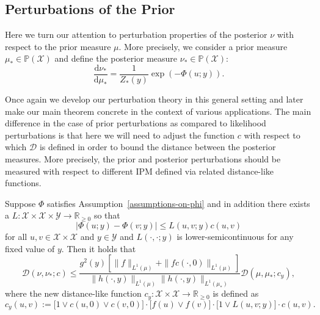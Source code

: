 \documentclass[final]{siamart171218}
\newcommand{\bhtodo}[1]{\todo[linecolor=red,backgroundcolor=red!25,bordercolor=red]{#1}}
\newcommand{\fh}[1]{{\color{blue} #1}}
\newcommand{\mcl}{\mathcal}
\newcommand{\mbb}{\mathbb}
\newcommand{\dd}{\text{d}}
\newcommand{\mX}{\mcl{X}}
\newcommand{\mY}{\mcl{Y}}
\newcommand{\PP}{\mbb{P}}
\newcommand{\cc}{c}
\newcommand{\K}{\mathcal{D}}
\newcommand{\D}{\mathcal{D}}
\begin{document}
\subsection{Perturbations of the Prior}\label{sec:pert-prior}
Here we turn our attention to perturbation properties of the posterior $\nu$ with
respect to the prior measure $\mu$. More precisely, we consider a prior measure
$\mu_\ast \in \PP(\mX)$ and define the posterior measure $\nu_\ast \in \PP(\mX)$:
\begin{equation}
  \label{Bayes-rule-perturbed-prior}
  \frac{\dd \nu_\ast}{\dd \mu_\ast} = \frac{1}{Z_\ast(y)} \exp \left( - \Phi(u; y) \right).
\end{equation}

Once again we develop our perturbation theory in this general setting and later make
our main theorem concrete in the context of various applications. The main difference in the case of prior perturbations
as compared to likelihood perturbations is that here we will need to adjust the 
function $c$ with respect to which $\D$ is defined
 in order to bound the distance between the posterior measures.
 More precisely, the prior and posterior perturbations should be measured with 
 respect to different IPM defined via related distance-like functions.

\begin{theorem}\label{thm:posterior-prior-perturbations-general}
  Suppose $\Phi$ satisfies Assumption~\ref{assumptions-on-phi} and in addition
     there exists a  
    $L: \mX \times \mX \times \mY \to \mbb{R}_{\ge 0}$ 
    so that
  \begin{equation*}
    | \Phi(u; y) - \Phi(v; y) | \le L(u,v; y) \cc( u, v) 
  \end{equation*}
  for all $u,v \in \mX \times \mX$ and $y \in \mY$ and $L(\cdot, \cdot; y)$ is 
  lower-semicontinuous for any fixed value of $y$.
  Then it holds that
  \begin{equation*}
    \K(\nu, \nu_\ast; \cc) \le  \frac{g^2(y) \left[ \| f\|_{L^1(\mu)} +   \| f c(\cdot, 0) \|_{L^1(\mu)} \right] }
    {\| h(\cdot, y) \|_{L^1(\mu)} \| h(\cdot, y) \|_{L^1(\mu_\ast)}}  \K(\mu, \mu_\ast; \cc_y),
  \end{equation*}
  where the new distance-like function $\cc_y : \mX \times \mX \to \mbb{R}_{\ge 0}$ is defined as
  \begin{equation}\label{def:c-ast}
    \cc_y(u,v) := \big[1 \vee \cc(u,0) \vee \cc(v,0)\big] \cdot
    \big[f(u) \vee f(v)\big] \cdot
    \big[ 1 \vee L(u,v; y) \big] \cdot \cc(u,v).
  \end{equation}
\end{theorem}
\end{document}
